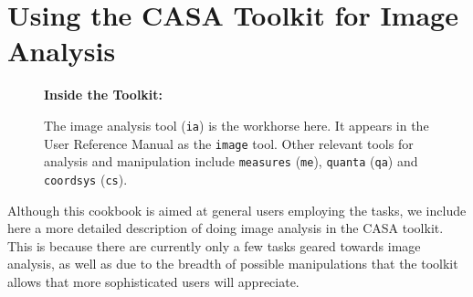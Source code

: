 \section{Using the CASA Toolkit for Image Analysis}
\label{section:analysis.toolkit}

\begin{wrapfigure}{r}{2.5in}
  \begin{boxedminipage}{2.5in}
     \centerline{\bf Inside the Toolkit:}
     The image analysis tool ({\tt ia}) is the workhorse here.
     It appears in the User Reference Manual as the {\tt image}
     tool.  Other relevant tools for analysis and manipulation
     include {\tt measures} ({\tt me}), {\tt quanta} ({\tt qa})
     and {\tt coordsys} ({\tt cs}).
  \end{boxedminipage}
\end{wrapfigure}

Although this cookbook is aimed at general users employing the
tasks, we include here a more detailed description of doing
image analysis in the CASA toolkit.  This is because
there are currently only a few tasks geared towards image analysis,
as well as due to the breadth of possible manipulations that the
toolkit allows that more sophisticated users will appreciate.

